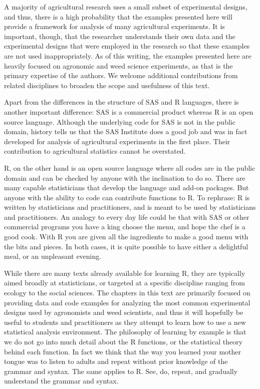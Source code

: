 \documentclass[letterpaper,]{book}
\begin{document}
A majority of agricultural research uses a small subset of experimental designs, and thus, there is a high probability that the examples presented here will provide a framework for analysis of many agricultural experiments. It is important, though, that the researcher understands their own data and the experimental designs that were employed in the research so that these examples are not used inappropriately. As of this writing, the examples presented here are heavily focused on agronomic and weed science experiments, as that is the primary expertise of the authors. We welcome additional contributions from related disciplines to broaden the scope and usefulness of this text.

Apart from the differences in the structure of SAS and R languages, there is another important difference: SAS is a commercial product whereas R is an open source language. Although the underlying code for SAS is not in the public domain, history tells us that the SAS Institute does a good job and was in fact developed for analysis of agricultural experiments in the first place. Their contribution to agricultural statistics cannot be overstated.

R, on the other hand is an open source language where all codes are in the public domain and can be checked by anyone with the inclination to do so. There are many capable statisticians that develop the language and add-on packages. But anyone with the ability to code can contribute functions to R. To rephrase: R is written by statisticians and practitioners, and is meant to be used by statisticians and practitioners. An analogy to every day life could be that with SAS or other commercial programs you have a king choose the menu, and hope the chef is a good cook. With R you are given all the ingredients to make a good menu with the bits and pieces. In both cases, it is quite possible to have either a delightful meal, or an unpleasant evening.

While there are many texts already available for learning R, they are typically aimed broadly at statisticians, or targeted at a specific discipline ranging from ecology to the social sciences. The chapters in this text are primarily focused on providing data and code examples for analyzing the most common experimental designs used by agronomists and weed scientists, and thus it will hopefully be useful to students and practitioners as they attempt to learn how to use a new statistical analysis environment. The philosophy of learning by example is that we do not go into much detail about the R functions, or the statistical theory behind each function. In fact we think that the way you learned your mother tongue was to listen to adults and repeat without prior knowledge of the grammar and syntax. The same applies to R. See, do, repeat, and gradually understand the grammar and syntax.
\end{document}
